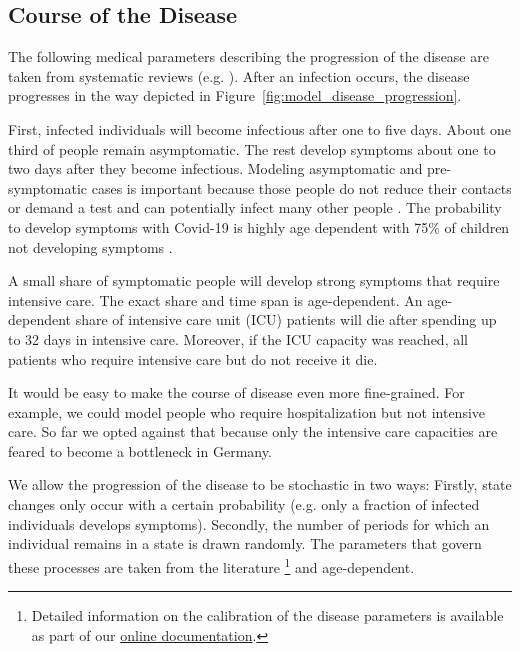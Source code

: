 \subsection{Course of the Disease}
\label{sub:disease_progression}

The following medical parameters describing the progression of the disease are taken from
systematic reviews (e.g. \citet{He2020}). After an infection occurs, the disease
progresses in the way depicted in Figure~\ref{fig:model_disease_progression}.


First, infected individuals will become infectious after one to five days. About one
third of people remain asymptomatic. The rest develop symptoms about one to two days
after they become infectious. Modeling asymptomatic and pre-symptomatic cases is
important because those people do not reduce their contacts or demand a test and can
potentially infect many other people \citep{Donsimoni2020}. The probability to develop
symptoms with Covid-19 is highly age dependent with 75\% of children not developing
symptoms \citep{Davies2020}.

A small share of symptomatic people will develop strong symptoms that require intensive
care. The exact share and time span is age-dependent. An age-dependent share of intensive
care unit (ICU) patients will die after spending up to 32 days in intensive care.
Moreover, if the ICU capacity was reached, all patients who require intensive care but do
not receive it die.

It would be easy to make the course of disease even more fine-grained. For example, we
could model people who require hospitalization but not intensive care. So far we opted
against that because only the intensive care capacities are feared to become a bottleneck
in Germany.

We allow the progression of the disease to be stochastic in two ways: Firstly, state
changes only occur with a certain probability (e.g. only a fraction of infected
individuals develops symptoms). Secondly, the number of periods for which an individual
remains in a state is drawn randomly. The parameters that govern these processes are
taken from the literature \footnote{ Detailed information on the calibration of the
disease parameters is available as part of our
\href{https://sid-dev.readthedocs.io/en/latest/reference_guides/epi_params.html}{online
documentation}.} and age-dependent.


